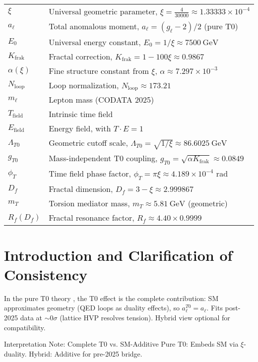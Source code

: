 \documentclass[12pt,a4paper]{article}
\begin{document}
	\begin{tabular}{ll}
		$\xi$ & Universal geometric parameter, $\xi = \frac{4}{30000} \approx 1.33333 \times 10^{-4}$ \\
		$a_\ell$ & Total anomalous moment, $a_\ell = (g_\ell - 2)/2$ (pure T0) \\
		$E_0$ & Universal energy constant, $E_0 = 1/\xi \approx \SI{7500}{\giga\electronvolt}$ \\
		$K_{\text{frak}}$ & Fractal correction, $K_{\text{frak}} = 1 - 100 \xi \approx 0.9867$ \\
		$\alpha(\xi)$ & Fine structure constant from $\xi$, $\alpha \approx 7.297 \times 10^{-3}$ \\
		$N_{\text{loop}}$ & Loop normalization, $N_{\text{loop}} \approx 173.21$ \\
		$m_\ell$ & Lepton mass (CODATA 2025) \\
		$T_{\text{field}}$ & Intrinsic time field \\
		$E_{\text{field}}$ & Energy field, with $T \cdot E = 1$ \\
		$\Lambda_{T0}$ & Geometric cutoff scale, $\Lambda_{T0} = \sqrt{1/\xi} \approx \SI{86.6025}{\giga\electronvolt}$ \\
		$g_{T0}$ & Mass-independent T0 coupling, $g_{T0} = \sqrt{\alpha K_{\text{frak}}} \approx 0.0849$ \\
		$\phi_T$ & Time field phase factor, $\phi_T = \pi \xi \approx 4.189 \times 10^{-4}$ rad \\
		$D_f$ & Fractal dimension, $D_f = 3 - \xi \approx 2.999867$ \\
		$m_T$ & Torsion mediator mass, $m_T \approx \SI{5.81}{\giga\electronvolt}$ (geometric) \\
		$R_f(D_f)$ & Fractal resonance factor, $R_f \approx 4.40 \times 0.9999$ \\
	\end{tabular}
	
	\section{Introduction and Clarification of Consistency}
	In the pure T0 theory \cite{T0_SI}, the T0 effect is the complete contribution: SM approximates geometry (QED loops as duality effects), so $a_\ell^{T0} = a_\ell$. Fits post-2025 data at $\sim 0\sigma$ (lattice HVP resolves tension). Hybrid view optional for compatibility.
	
	\begin{interpretation}{Interpretation Note: Complete T0 vs. SM-Additive}
		Pure T0: Embeds SM via $\xi$-duality. Hybrid: Additive for pre-2025 bridge.
	\end{interpretation}
	
\end{document}
